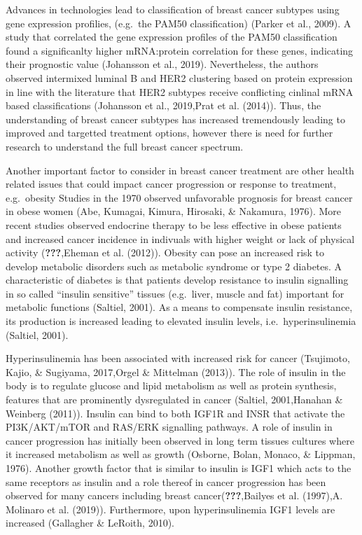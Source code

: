 \documentclass[12pt,openany]{book}
\begin{document}
Advances in technologies lead to classification of breast cancer
subtypes using gene expression profilies, (e.g.~the PAM50
classification) (Parker et al., 2009). A study that correlated the gene
expression profiles of the PAM50 classification found a significanlty
higher mRNA:protein correlation for these genes, indicating their
prognostic value (Johansson et al., 2019). Nevertheless, the authors
observed intermixed luminal B and HER2 clustering based on protein
expression in line with the literature that HER2 subtypes receive
conflicting cinlinal mRNA based classifications (Johansson et al.,
2019,Prat et al. (2014)). Thus, the understanding of breast cancer
subtypes has increased tremendously leading to improved and targetted
treatment options, however there is need for further research to
understand the full breast cancer spectrum.

Another important factor to consider in breast cancer treatment are
other health related issues that could impact cancer progression or
response to treatment, e.g.~obesity Studies in the 1970 observed
unfavorable prognosis for breast cancer in obese women (Abe, Kumagai,
Kimura, Hirosaki, \& Nakamura, 1976). More recent studies observed
endocrine therapy to be less effective in obese patients and increased
cancer incidence in indivuals with higher weight or lack of physical
activity ({\textbf{???}},Eheman et al. (2012)). Obesity can pose an
increased risk to develop metabolic disorders such as metabolic syndrome
or type 2 diabetes. A characteristic of diabetes is that patients
develop resistance to insulin signalling in so called ``insulin
sensitive'' tissues (e.g.~liver, muscle and fat) important for metabolic
functions (Saltiel, 2001). As a means to compensate insulin resistance,
its production is increased leading to elevated insulin levels,
i.e.~hyperinsulinemia (Saltiel, 2001).

Hyperinsulinemia has been associated with increased risk for cancer
(Tsujimoto, Kajio, \& Sugiyama, 2017,Orgel \& Mittelman (2013)). The
role of insulin in the body is to regulate glucose and lipid metabolism
as well as protein synthesis, features that are prominently dysregulated
in cancer (Saltiel, 2001,Hanahan \& Weinberg (2011)). Insulin can bind
to both IGF1R and INSR that activate the PI3K/AKT/mTOR and RAS/ERK
signalling pathways. A role of insulin in cancer progression has
initially been observed in long term tissues cultures where it increased
metabolism as well as growth (Osborne, Bolan, Monaco, \& Lippman, 1976).
Another growth factor that is similar to insulin is IGF1 which acts to
the same receptors as insulin and a role thereof in cancer progression
has been observed for many cancers including breast
cancer({\textbf{???}},Bailyes et al. (1997),A. Molinaro et al. (2019)).
Furthermore, upon hyperinsulinemia IGF1 levels are increased (Gallagher
\& LeRoith, 2010).
\end{document}
